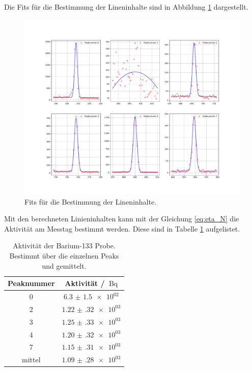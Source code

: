 \FloatBarrier
Die Fits für die Bestimmung der Lineninhalte sind in Abbildung \ref{fig:Linieninhalt_03} dargestellt.
\FloatBarrier
\begin{figure}
  \centering
  \includegraphics[width=\textwidth,keepaspectratio]{figure/03_subplot.pdf}
  \caption{Fits für die Bestimmung der Lineninhalte.}
  \label{fig:Linieninhalt_03}
\end{figure}
Mit den berechneten Linieninhalten kann mit der Gleichung \eqref{eq:eta_N} die Aktivität am Messtag bestimmt werden. 
Diese sind in Tabelle \ref{tab:Akti_03} aufgelistet.
\FloatBarrier
\begin{table}
  \centering
  \caption{Aktivität der Barium-133 Probe. Bestimmt über die einzelnen Peaks und gemittelt.}
  \label{tab:Akti_03}
  \begin{tabular}{c c}
    \toprule
    Peaknummer & Aktivität / $\SI{}{\becquerel}$\\
    \midrule
    0&$\num{6.3(15)e+02}$\\
    2&$\num{1.22(32)e+03}$\\
    3&$\num{1.25(33)e+03}$\\
    4&$\num{1.20(32)e+03}$\\
    7&$\num{1.15(31)e+03}$\\
    \midrule
    mittel& $\num{1.09(28)e+03}$\\
    \bottomrule
  \end{tabular}
\end{table}








